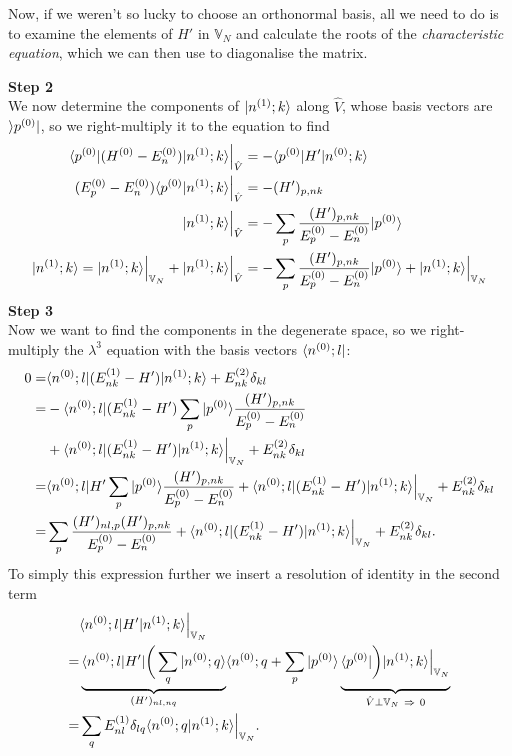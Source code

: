 Now, if we weren't so lucky to choose an orthonormal basis, all we need to do is to examine the elements of $H'$ in $\mathbb{V}_N$ and calculate the roots of the 
\textit{characteristic equation}, which we can then use to diagonalise the matrix. \par
\textbf{Step 2}\\
We now determine the components of $|n^{(1)};k\rangle$ along $\hat{V}$, whose basis vectors 
are $\rangle p^{(0)}|$, so we right-multiply it to the equation to find
\begin{equation}
\begin{aligned}
\langle p^{(0)} | (H^{(0)}-E_n^{(0)})|n^{(1)};k \rangle\Big|_{\hat{V}}&=-\langle p^{(0)} | H'|n^{(0)};k \rangle\\
(E_p^{(0)}-E_n^{(0)})\langle p^{(0)} | n^{(1)};k \rangle\Big|_{\hat{V}}&=-(H')_{p,nk}\\
|n^{(1)};k\rangle\Big|_{\hat{V}}&=-\sum_p\frac{(H')_{p,nk}}{E_p^{(0)}-E_n^{(0)}}|p^{(0)}\rangle\\
|n^{(1)};k\rangle=|n^{(1)};k\rangle\Big|_{\mathbb{V}_N}+|n^{(1)};k\rangle\Big|_{\hat{V}}&=-\sum_p\frac{(H')_{p,nk}}{E_p^{(0)}-E_n^{(0)}}|p^{(0)}\rangle+|n^{(1)};k\rangle\Big|_{\mathbb{V}_N}
\end{aligned}
\end{equation}
\textbf{Step 3}\\
Now we want to find the components in the degenerate space, so we right-multiply the 
$\lambda^3$ equation with the basis vectors $\langle n^{(0)};l|$:
\begin{equation}
\begin{aligned}
0=&\langle n^{(0)};l | (E^{(1)}_{nk}-H')|n^{(1)};k \rangle+E^{(2)}_{nk}\delta_{kl}\\
=&-\langle n^{(0)};l | (E^{(1)}_{nk}-H')\sum_p|p^{(0)} \rangle\frac{(H')_{p,nk}}{E_p^{(0)}-E_n^{(0)}}\\
&+\langle n^{(0)};l | (E^{(1)}_{nk}-H')|n^{(1)};k \rangle\Big|_{\mathbb{V}_N}+E^{(2)}_{nk}\delta_{kl}\\
=&\langle n^{(0)};l | H'\sum_p|p^{(0)} \rangle\frac{(H')_{p,nk}}{E_p^{(0)}-E_n^{(0)}}+\langle n^{(0)};l | (E^{(1)}_{nk}-H')|n^{(1)};k \rangle\Big|_{\mathbb{V}_N}+E^{(2)}_{nk}\delta_{kl}\\
=&\sum_p\frac{(H')_{nl,p}(H')_{p,nk}}{E_p^{(0)}-E_n^{(0)}}+\langle n^{(0)};l | (E^{(1)}_{nk}-H')|n^{(1)};k \rangle\Big|_{\mathbb{V}_N}+E^{(2)}_{nk}\delta_{kl}.
\end{aligned}
\end{equation}
To simply this expression further we insert a resolution of identity in the second term
\begin{equation}
\begin{aligned}
&\lgl n^{(0)};l | H'|n^{(1)};k \rgl\Big|_{\mathbb{V}_N}\\
=&\underbrace{\lgl n^{(0)};l | H'|\bigg(\sum_q|n^{(0)};q \rgl}_{(H')_{nl,nq}} \lgl n^{(0)};q+\sum_p|p^{(0)}\rgl\underbrace{\vphantom{\bigg(\sum_q}\lgl p^{(0)}| \bigg)|n^{(1)};k\rgl\Big|_{\mathbb{V}_N}}_{\hat{V}\perp\mathbb{V}_N\ \imp\ 0}\\
=&\sum_q E^{(1)}_{nl}\delta_{lq}\lgl n^{(0)};q | n^{(1)};k \rgl\Big|_{\mathbb{V}_N}.
\end{aligned}
\end{equation}
